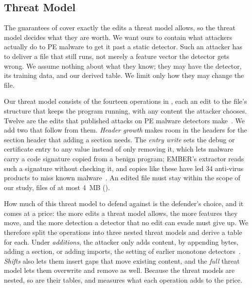 \subsection{Threat Model}
\label{sec:instances:catalogue}


The guarantees of  cover exactly the edits a threat model allows, so the threat model decides what
they are worth. We want ours to contain what attackers actually do to PE malware to get it past a static detector.
Such an attacker has to deliver a file that still runs, not merely a feature vector the detector gets wrong. We assume
nothing about what they know; they may have the detector, its training data, and our derived table. We limit only how
they may change the file.

Our threat model consists of the fourteen operations in , each an edit to the file's
structure that keeps the program running, with any content the attacker chooses. Twelve are the edits that published
attacks on PE malware detectors make~\cite{demetrio2021adversarial,song2022mab}. We add two that follow from them.
\emph{Header growth} makes room in the headers for the section header that adding a section needs. The \emph{entry
write} sets the debug or certificate entry to any value instead of only removing it, which lets malware carry a code
signature copied from a benign program; EMBER's extractor reads such a signature without checking it, and copies like
these have led 34 anti-virus products to miss known malware~\cite{kim2017certified}. An edited file must stay within
the scope of our study, files of at most 4~MB ().

How much of this threat model to defend against is the defender's choice, and it comes at a price: the more edits a
threat model allows, the more features they move, and the more detection a detector that no edit can evade must give
up. We therefore split the operations into three nested threat models and derive a table for each. Under
\emph{additions}, the attacker only adds content, by appending bytes, adding a section, or adding imports, the setting
of earlier monotone detectors~\cite{incer2018adversarially}. \emph{Shifts} also lets them insert gaps that move existing
content, and the \emph{full} threat model lets them overwrite and remove as well. Because the threat models are nested,
so are their tables, and  measures what each operation adds to the price.

